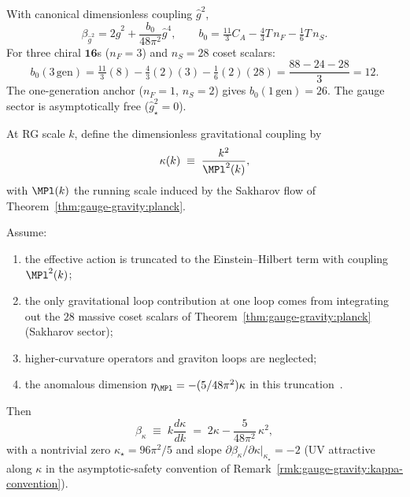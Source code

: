 \begin{theorem}\label{thm:gauge-gravity:beta-g}
With canonical dimensionless coupling $\hat g^2$,
\begin{equation}\label{eq:gauge-gravity:beta}
  \beta_{\hat g^2}=2\hat g^2+\frac{b_0}{48\pi^2}\hat g^4,
  \qquad
  b_0=\tfrac{11}{3}C_A-\tfrac{4}{3}T\,n_F-\tfrac{1}{6}T\,n_S.
\end{equation}
For three chiral $\mathbf{16}$s ($n_F=3$) and $n_S=28$ coset scalars:
\begin{equation}\label{eq:gauge-gravity:b0}
  b_0(3\,\mathrm{gen})
  =\tfrac{11}{3}(8)-\tfrac{4}{3}(2)(3)-\tfrac{1}{6}(2)(28)
  =\frac{88-24-28}{3}=12.
\end{equation}
The one-generation anchor ($n_F=1$, $n_S=2$) gives $b_0(1\,\mathrm{gen})=26$.
The gauge sector is asymptotically free ($\hat g^2_\star=0$).
\end{theorem}

\begin{definition}
\label{def:gauge-gravity:kappa}
At RG scale $k$, define the dimensionless gravitational coupling by
\begin{equation}\label{eq:gauge-gravity:kappa-def}
  \kappa(k)\;\equiv\;\frac{k^2}{\MPl^2(k)},
\end{equation}
with $\MPl(k)$ the running scale induced by the Sakharov flow of
Theorem~\ref{thm:gauge-gravity:planck}.
\end{definition}

\begin{theorem}
\label{thm:gauge-gravity:kappa-oneloop}
Assume:
\begin{enumerate}[label=(\roman*),leftmargin=*]
  \item the effective action is truncated to the Einstein--Hilbert term with
    coupling $\MPl^2(k)$;
  \item the only gravitational loop contribution at one loop comes from
    integrating out the $28$ massive coset scalars of
    Theorem~\ref{thm:gauge-gravity:planck} (Sakharov sector);
  \item higher-curvature operators and graviton loops are neglected;
  \item the anomalous dimension $\eta_{\MPl}=-(5/48\pi^2)\kappa$ in this
    truncation~\cite{Reuter1998}.
\end{enumerate}
Then
\begin{equation}\label{eq:gauge-gravity:betakappa}
  \beta_\kappa\;\equiv\;k\frac{d\kappa}{dk}
  \;=\;2\kappa-\frac{5}{48\pi^2}\,\kappa^2,
\end{equation}
with a nontrivial zero $\kappa_\star=96\pi^2/5$ and slope
$\partial\beta_\kappa/\partial\kappa|_{\kappa_\star}=-2$ (UV attractive
along $\kappa$ in the asymptotic-safety convention of
Remark~\ref{rmk:gauge-gravity:kappa-convention}).
\end{theorem}

